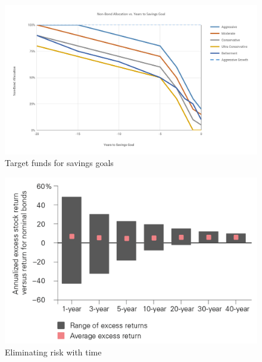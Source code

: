 \documentclass{article}
\begin{document}
\vspace{10pt}

\begin{figure}[!htb]
    \centering
    \includegraphics[width=\textwidth]{imgs/101.png}
    \caption{Target funds for savings goals}
\end{figure}

\vspace{10pt}

\begin{figure}[!htb]
    \centering
    \includegraphics[width=\textwidth]{imgs/102.png}
    \caption{Eliminating risk with time}
\end{figure}

\vspace{10pt}
\end{document}
